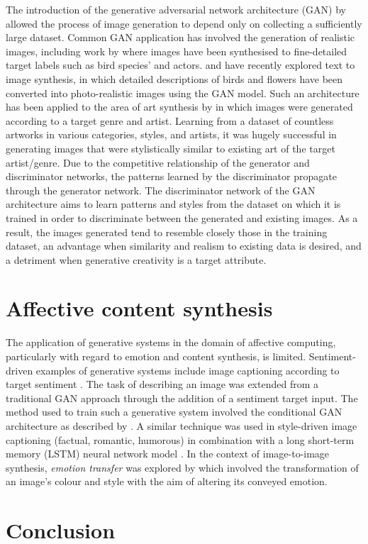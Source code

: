 \documentclass{article}
\begin{document}
The introduction of the generative adversarial network architecture (GAN) by \citet{GAN} allowed the process of image generation to depend only on collecting a sufficiently large dataset.
Common GAN application has involved the generation of realistic images, including work by \citet{bao2017cvae} where images have been synthesised to fine-detailed target labels such as bird species' and actors.
\citet{zhang2017stackgan} and \citet{reed2016generative} have recently explored text to image synthesis, in which detailed descriptions of birds and flowers have been converted into photo-realistic images using the GAN model.
Such an architecture has been applied to the area of art synthesis by \citet{tan2017artgan} in which images were generated according to a target genre and artist.
Learning from a dataset of countless artworks in various categories, styles, and artists, it was hugely successful in generating images that were stylistically similar to existing art of the target artist/genre.
Due to the competitive relationship of the generator and discriminator networks, the patterns learned by the discriminator propagate through the generator network.
The discriminator network of the GAN architecture aims to learn patterns and styles from the dataset on which it is trained in order to discriminate between the generated and existing images.
As a result, the images generated tend to resemble closely those in the training dataset, an advantage when similarity and realism to existing data is desired, and a detriment when generative creativity is a target attribute.


\section{Affective content synthesis}

The application of generative systems in the domain of affective computing, particularly with regard to emotion and content synthesis, is limited.
Sentiment-driven examples of generative systems include image captioning according to target sentiment \citep{mathews2016senticap}.
The task of describing an image was extended from a traditional GAN approach through the addition of a sentiment target input.
The method used to train such a generative system involved the conditional GAN architecture as described by \citet{gauthier2014conditional}.
A similar technique was used in style-driven image captioning (factual, romantic, humorous) in combination with a long short-term memory (LSTM) neural network model \citet{gan2017stylenet}.
In the context of image-to-image synthesis, \textit{emotion transfer} was explored by \citet{ali2017emotional} which involved the transformation of an image's colour and style with the aim of altering its conveyed emotion.


\section{Conclusion}



\end{document}
